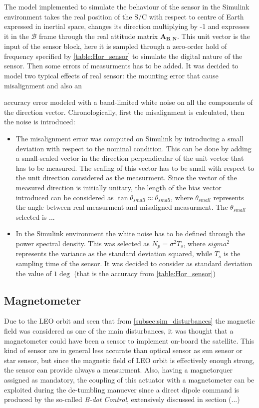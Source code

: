 The model implemented to simulate the behaviour of the sensor in the Simulink environment 
takes the real position of the S/C with respect to centre of Earth expressed in inertial space, changes its
direction multiplying by -1 and expresses it in the $\mathcal{B}$ frame through the real attitude matrix $\boldsymbol{A_{B,N}}$. 
This unit vector is the input of the sensor block, here it is sampled through a zero-order hold of frequency specified by
\autoref{table:Hor_sensor} to simulate the digital nature of the sensor. Then some errors of measurments has to be added.
It was decided to model two typical effects of real sensor: the mounting error that cause misalignment and also an 

accuracy error modeled with a band-limited white noise on all the components of the direction vector. 
Chronologically, first the misalignment is calculated, then the noise is introduced:
\begin{itemize}
    \item The misalignment error was computed on Simulink by introducing a small deviation with respect to the nominal condition. This can
    be done by adding a small-scaled vector in the direction perpendicular of the unit vector that has to be measured. The scaling of 
    this vector has to be small with respect to the unit direction considered as the measurment. Since the vector of the measured 
    direction is initially unitary, the length of the bias vector introduced can be considered as $\tan{\theta_{small}} \approx \theta_{small}$,
    where $\theta_{small}$ represents the angle between real measurment and misaligned measurment. The $\theta_{small}$ selected is ... 
    \item In the Simulink environment the white noise has to be defined through the power spectral density. This was selected as $N_p = \sigma^2 {T_s} $, 
    where $sigma^2$ represents the variance as the standard deviation squared, while $T_s$ is the sampling time of the sensor.
    It was decided to consider as standard deviation the value of $1\deg$ (that is the accuracy from \autoref{table:Hor_sensor})
\end{itemize}

\subsection{Magnetometer}
Due to the LEO orbit and seen that from \autoref{subsec:sim_disturbances} the magnetic field  was considered as one of the main disturbances, 
it was thought that a magnetometer could have been a sensor to implement on-board the satellite. This kind of sensor are in general less accurate 
than optical sensor as sun sensor or star sensor, but since the magnetic field of LEO orbit is effectively enough strong, the sensor can provide 
always a measurment. Also, having a magnetorquer assigned as mandatory, the coupling of this actuator with a magnetometer can be exploited during 
the de-tumbling manuever since a direct dipole command is produced by the so-called \textit{B-dot Control}, extensively discussed in section (...)

